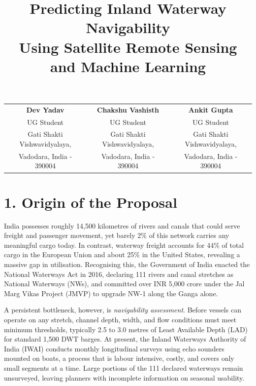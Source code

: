 \documentclass[12pt,a4paper]{article}
\title{\textbf{Predicting Inland Waterway Navigability\\Using Satellite Remote Sensing and Machine Learning}}
\author{}
\date{}
\begin{document}
\maketitle

\vspace{-1cm}
\begin{center}
\begin{tabular}{ccc}
\textbf{Dev Yadav} & \textbf{Chakshu Vashisth} & \textbf{Ankit Gupta} \\
{\small UG Student} & {\small UG Student} & {\small UG Student} \\
{\small Gati Shakti Vishwavidyalaya,} & {\small Gati Shakti Vishwavidyalaya,} & {\small Gati Shakti Vishwavidyalaya,} \\
{\small Vadodara, India - 390004} & {\small Vadodara, India - 390004} & {\small Vadodara, India - 390004} \\
\end{tabular}
\end{center}

\vspace{0.3cm}
\onehalfspacing

\section*{1. Origin of the Proposal}

India possesses roughly 14,500 kilometres of rivers and canals that could serve freight and passenger movement, yet barely 2\% of this network carries any meaningful cargo today. In contrast, waterway freight accounts for 44\% of total cargo in the European Union and about 25\% in the United States, revealing a massive gap in utilisation. Recognising this, the Government of India enacted the National Waterways Act in 2016, declaring 111 rivers and canal stretches as National Waterways (NWs), and committed over INR 5,000 crore under the Jal Marg Vikas Project (JMVP) to upgrade NW-1 along the Ganga alone.

A persistent bottleneck, however, is \textit{navigability assessment}. Before vessels can operate on any stretch, channel depth, width, and flow conditions must meet minimum thresholds, typically 2.5 to 3.0 metres of Least Available Depth (LAD) for standard 1,500 DWT barges. At present, the Inland Waterways Authority of India (IWAI) conducts monthly longitudinal surveys using echo sounders mounted on boats, a process that is labour intensive, costly, and covers only small segments at a time. Large portions of the 111 declared waterways remain unsurveyed, leaving planners with incomplete information on seasonal usability.
\end{document}
